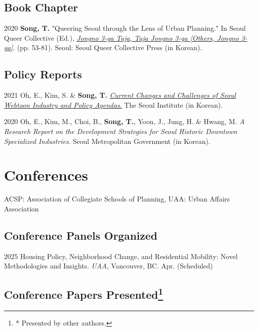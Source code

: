 \documentclass[12pt,letterpaper]{report}
\begin{document}
    \subsection*{Book Chapter}
    \begin{tablist}
        \item[2020] \tab{}\textbf{Song, T.} "Queering Seoul through the Lens of Urban Planning." In Seoul Queer Collective (Ed.), \emph{\href{http://www.kyobobook.co.kr/product/detailViewKor.laf?ejkGb=KOR&mallGb=KOR&barcode=9791197096501}{Jongno 3-ga Taja, Taja Jongno 3-ga [Others, Jongno 3-ga]}}. (pp. 53-81). Seoul: Seoul Queer Collective Press (in Korean).
    \end{tablist}
    \subsection*{Policy Reports}
    \begin{tablist}
        \item[2021] \tab{}Oh, E., Kim, S. \& \textbf{Song, T.} \emph{\href{http://global.si.re.kr/content/current-changes-and-challenges-seoul-webtoon-industry-and-policy-agendas}{Current Changes and Challenges of Seoul Webtoon Industry and Policy Agendas.}} The Seoul Institute (in Korean).
        \item[2020] \tab{}Oh, E., Kim, M., Choi, B., \textbf{Song, T.}, Yoon, J., Jung, H. \& Hwang, M. \emph{A Research Report on the Development Strategies for Seoul Historic Downtown Specialized Industries.} Seoul Metropolitan Government (in Korean).
    \end{tablist}

\section*{Conferences}
ACSP: Association of Collegiate Schools of Planning, UAA: Urban Affairs Association

\subsection*{Conference Panels Organized}

\begin{tablist}
  \item[2025] \tab{}Housing Policy, Neighborhood Change, and Residential Mobility: Novel Methodologies and Insights. \emph{UAA}, Vancouver, BC. Apr. (Scheduled)
\end{tablist}

\subsection*{Conference Papers Presented\footnote{ * Presented by other authors.}}
\end{document}
